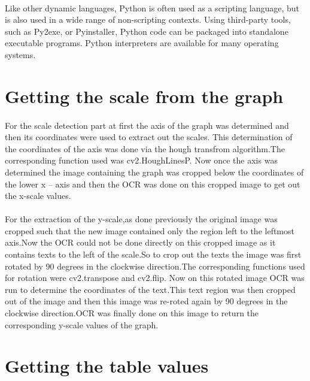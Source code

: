 \documentclass[12pts]{scrreprt}
\begin{document}
\paragraph{}
Like other dynamic languages, Python is often used as a scripting language, but is also used in a wide range of non-scripting contexts. Using third-party tools, such as Py2exe, or Pyinstaller, Python code can be packaged into standalone executable programs. Python interpreters are available for many operating systems.

\section{Getting the scale from the graph}
\paragraph{}
For the scale detection part at first the axis of the graph was determined and then its coordinates were used to extract out the scales. This determination of the coordinates of the axis was done via the hough transfrom algorithm.The corresponding function used was cv2.HoughLinesP.
Now once the axis was determined the image containing the graph was cropped below the coordinates of the lower x – axis and then the OCR was done on this cropped image to get out the x-scale values.
\paragraph{}
For the extraction of the y-scale,as done previously the original image was cropped such that the new image contained only the region left to the leftmost axis.Now the OCR could not be done directly on this cropped image as it contains texts to the left of the scale.So to crop out the texts the image was first rotated by 90 degrees in the clockwise direction.The corresponding functions used for rotation were cv2.transpose
 and cv2.flip. Now on this rotated image OCR was run to determine the coordinates of the text.This text region was then cropped out of the image and then this image was re-roted again by 90 degrees in the clockwise direction.OCR was finally done on this image to return the corresponding y-scale values of the graph.
\section{Getting the table values}
\end{document}
